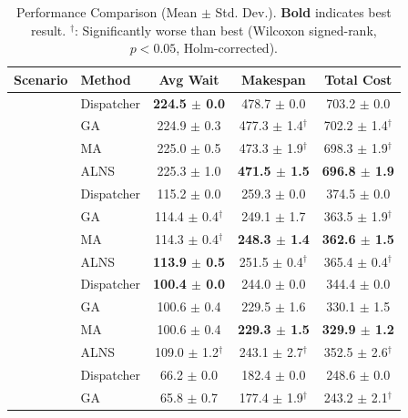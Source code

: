 \begin{table}[t]
\centering
\caption{Performance Comparison (Mean $\pm$ Std. Dev.). \textbf{Bold} indicates best result. $^\dagger$: Significantly worse than best (Wilcoxon signed-rank, $p<0.05$, Holm-corrected).}
\label{tab:performance}
\setlength{\tabcolsep}{6pt}
\begin{tabular}{llccc}
\toprule
\textbf{Scenario} & \textbf{Method} & \textbf{Avg Wait} & \textbf{Makespan} & \textbf{Total Cost} \\
\midrule
{}
 & Dispatcher & \textbf{224.5 $\pm$ 0.0} & 478.7 $\pm$ 0.0 & 703.2 $\pm$ 0.0 \\
 & GA & 224.9 $\pm$ 0.3 & 477.3 $\pm$ 1.4$^\dagger$ & 702.2 $\pm$ 1.4$^\dagger$ \\
 & MA & 225.0 $\pm$ 0.5 & 473.3 $\pm$ 1.9$^\dagger$ & 698.3 $\pm$ 1.9$^\dagger$ \\
 & ALNS & 225.3 $\pm$ 1.0 & \textbf{471.5 $\pm$ 1.5} & \textbf{696.8 $\pm$ 1.9} \\
\addlinespace
{}
 & Dispatcher & 115.2 $\pm$ 0.0 & 259.3 $\pm$ 0.0 & 374.5 $\pm$ 0.0 \\
 & GA & 114.4 $\pm$ 0.4$^\dagger$ & 249.1 $\pm$ 1.7 & 363.5 $\pm$ 1.9$^\dagger$ \\
 & MA & 114.3 $\pm$ 0.4$^\dagger$ & \textbf{248.3 $\pm$ 1.4} & \textbf{362.6 $\pm$ 1.5} \\
 & ALNS & \textbf{113.9 $\pm$ 0.5} & 251.5 $\pm$ 0.4$^\dagger$ & 365.4 $\pm$ 0.4$^\dagger$ \\
\addlinespace
{}
 & Dispatcher & \textbf{100.4 $\pm$ 0.0} & 244.0 $\pm$ 0.0 & 344.4 $\pm$ 0.0 \\
 & GA & 100.6 $\pm$ 0.4 & 229.5 $\pm$ 1.6 & 330.1 $\pm$ 1.5 \\
 & MA & 100.6 $\pm$ 0.4 & \textbf{229.3 $\pm$ 1.5} & \textbf{329.9 $\pm$ 1.2} \\
 & ALNS & 109.0 $\pm$ 1.2$^\dagger$ & 243.1 $\pm$ 2.7$^\dagger$ & 352.5 $\pm$ 2.6$^\dagger$ \\
\addlinespace
{}
 & Dispatcher & 66.2 $\pm$ 0.0 & 182.4 $\pm$ 0.0 & 248.6 $\pm$ 0.0 \\
 & GA & 65.8 $\pm$ 0.7 & 177.4 $\pm$ 1.9$^\dagger$ & 243.2 $\pm$ 2.1$^\dagger$ \\

\end{tabular}
\end{table}
